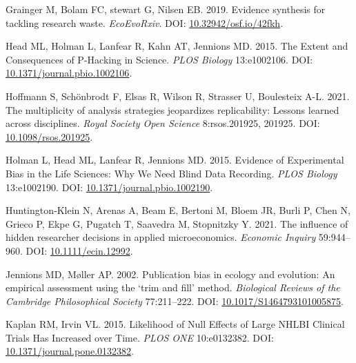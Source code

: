 \documentclass[10pt,a4paper]{article}
\newlength{\cslhangindent}
\newlength{\cslentryspacingunit} %
\newenvironment{CSLReferences}[2] %
 {%
  \setlength{\parindent}{0pt}
  \ifodd #1
  \let\oldpar\par
  \def\par{\hangindent=\cslhangindent\oldpar}
  \fi
  \setlength{\parskip}{#2\cslentryspacingunit}
 }%
 {}
\begin{document}
\begin{CSLReferences}{1}{0}
\leavevmode{}%
Grainger M, Bolam FC, stewart G, Nilsen EB. 2019. Evidence synthesis for tackling research waste. \emph{EcoEvoRxiv}. DOI: \href{https://doi.org/10.32942/osf.io/42fkh}{10.32942/osf.io/42fkh}.

\leavevmode{}%
Head ML, Holman L, Lanfear R, Kahn AT, Jennions MD. 2015. The {Extent} and {Consequences} of {P}-{Hacking} in {Science}. \emph{PLOS Biology} 13:e1002106. DOI: \href{https://doi.org/10.1371/journal.pbio.1002106}{10.1371/journal.pbio.1002106}.

\leavevmode{}%
Hoffmann S, Schönbrodt F, Elsas R, Wilson R, Strasser U, Boulesteix A-L. 2021. The multiplicity of analysis strategies jeopardizes replicability: Lessons learned across disciplines. \emph{Royal Society Open Science} 8:rsos.201925, 201925. DOI: \href{https://doi.org/10.1098/rsos.201925}{10.1098/rsos.201925}.

\leavevmode{}%
Holman L, Head ML, Lanfear R, Jennions MD. 2015. Evidence of {Experimental} {Bias} in the {Life} {Sciences}: {Why} {We} {Need} {Blind} {Data} {Recording}. \emph{PLOS Biology} 13:e1002190. DOI: \href{https://doi.org/10.1371/journal.pbio.1002190}{10.1371/journal.pbio.1002190}.

\leavevmode{}%
Huntington‐Klein N, Arenas A, Beam E, Bertoni M, Bloem JR, Burli P, Chen N, Grieco P, Ekpe G, Pugatch T, Saavedra M, Stopnitzky Y. 2021. The influence of hidden researcher decisions in applied microeconomics. \emph{Economic Inquiry} 59:944--960. DOI: \href{https://doi.org/10.1111/ecin.12992}{10.1111/ecin.12992}.

\leavevmode{}%
Jennions MD, Møller AP. 2002. Publication bias in ecology and evolution: An empirical assessment using the `trim and fill' method. \emph{Biological Reviews of the Cambridge Philosophical Society} 77:211--222. DOI: \href{https://doi.org/10.1017/S1464793101005875}{10.1017/S1464793101005875}.

\leavevmode{}%
Kaplan RM, Irvin VL. 2015. Likelihood of {Null} {Effects} of {Large} {NHLBI} {Clinical} {Trials} {Has} {Increased} over {Time}. \emph{PLOS ONE} 10:e0132382. DOI: \href{https://doi.org/10.1371/journal.pone.0132382}{10.1371/journal.pone.0132382}.


\end{CSLReferences}
\end{document}

